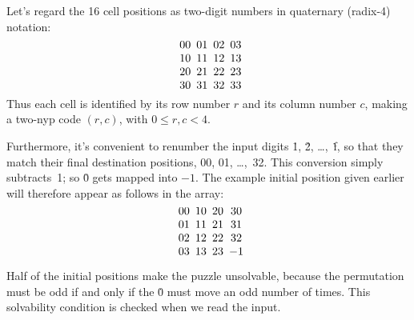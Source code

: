 Let's regard the 16 cell positions as two-digit
numbers in quaternary
(radix-4) notation:
$$\vcenter{\halign{&\enspace#\cr
00&01&02&03\cr
10&11&12&13\cr
20&21&22&23\cr
30&31&32&33\cr
}}$$
Thus each cell is identified by its row number $r$ and its column number $c$,
making a two-nyp code $(r,c)$, with $0\le r,c<4$.

Furthermore, it's convenient to renumber the input digits \.1, \.2,
\dots,~\.f, so that they match their final destination positions,
00, 01, \dots,~32. This conversion simply subtracts~1; so \.0 gets
mapped into $-1$. The example initial position given earlier
will therefore appear as follows in the  array:
$$\vcenter{\halign{&\enspace$\hfil#\hfil$\cr
00&10&20&30\cr
01&11&21&31\cr
02&12&22&32\cr
03&13&23&-1\cr
}}$$

Half of the initial positions make the puzzle unsolvable, because the
permutation must be odd if and only if the \.0 must move an odd number of
times. This solvability condition is checked when we read the input.

